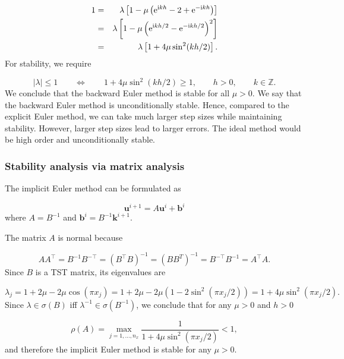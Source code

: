 \documentclass[12pt,a4paper]{article}
\begin{document}
\begin{eqnarray*}
1 &=& \lambda\left[1 - \mu\left({\rm e}^{{\rm i}kh} - 2 + {\rm e}^{-{\rm i}kh} \right)\right] \\
&=& \lambda\left[1 - \mu\left({\rm e}^{{\rm i}kh/2} - {\rm e}^{-{\rm i}kh/2} \right)^2\right] \\
&=& \lambda\left[1 + 4\mu\sin^2(kh/2)\right].
\end{eqnarray*}
For stability, we require

\[
\vert \lambda \vert \leq 1 \qquad \Leftrightarrow \qquad 1 + 4\mu\sin^2(kh/2) \geq 1, \qquad h>0, \qquad k \in \mathbb{Z}.
\]
We conclude that the backward Euler method is stable for all $\mu > 0$.  We say that the backward Euler method is unconditionally stable.  Hence, compared to the explicit Euler method, we can take much larger step sizes while maintaining stability.   However, larger step sizes lead to larger errors.   The ideal method would be high order and unconditionally stable.

\subsubsection{Stability analysis via matrix analysis}
The implicit Euler method can be formulated as

\[
\mathbf{u}^{i+1} = A\mathbf{u}^i + \mathbf{b}^i
\]
where $A = B^{-1}$ and $\mathbf{b}^i = B^{-1}\mathbf{k}^{i+1}$.  

The matrix $A$ is normal because

\[
AA^{\top} = B^{-1}B^{-\top} = \left(B^{\top}B  \right)^{-1} = \left(B B^T  \right)^{-1} = B^{-\top}B^{-1} = A^{\top}A.
\]
Since $B$ is a TST matrix, its eigenvalues are

\[
\lambda_j = 1 + 2\mu - 2\mu\cos\left(\pi x_j  \right) = 1 + 2\mu -2\mu(1 - 2\sin^2(\pi x_j/2)) = 1 + 4\mu\sin^2(\pi x_j/2).
\]
Since $\lambda \in \sigma(B)$ iff $\lambda^{-1} \in \sigma(B^{-1})$, we conclude that for any $\mu > 0$ and $h > 0$ 

\[
\rho(A) = \max_{j = 1, \ldots, n_x} \frac{1}{1 + 4\mu \sin^2(\pi x_j/2)} < 1, 
\]
and therefore the implicit Euler method is stable for any $\mu > 0$.
\end{document}
